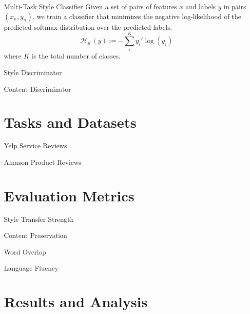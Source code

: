 \documentclass[aspectratio=169]{beamer}
\begin{document}
\begin{frame}{Multi-Task Style Classifier}
	Given a set of pairs of features $x$ and labels $y$ in pairs $(x_n, y_n)$, we train a classifier that minimizes the negative log-likelihood of the predicted softmax distribution over the predicted labels.
	\begin{equation}
		\mathcal{H}_{y'} (y) := - \sum_{i}^K y_{i}' \log (y_i)
	\end{equation}
	where $K$ is the total number of classes.
\end{frame}

\begin{frame}{Style Discriminator}
\end{frame}

\begin{frame}{Content Discriminator}
\end{frame}

% 

\section{Tasks and Datasets}

\begin{frame}{Yelp Service Reviews}
\end{frame}

\begin{frame}{Amazon Product Reviews}
\end{frame}

% 

\section{Evaluation Metrics}

\begin{frame}{Style Transfer Strength}
\end{frame}

\begin{frame}{Content Preservation}
\end{frame}

\begin{frame}{Word Overlap}
\end{frame}

\begin{frame}{Language Fluency}
\end{frame}

% 

\section{Results and Analysis}
\end{document}
